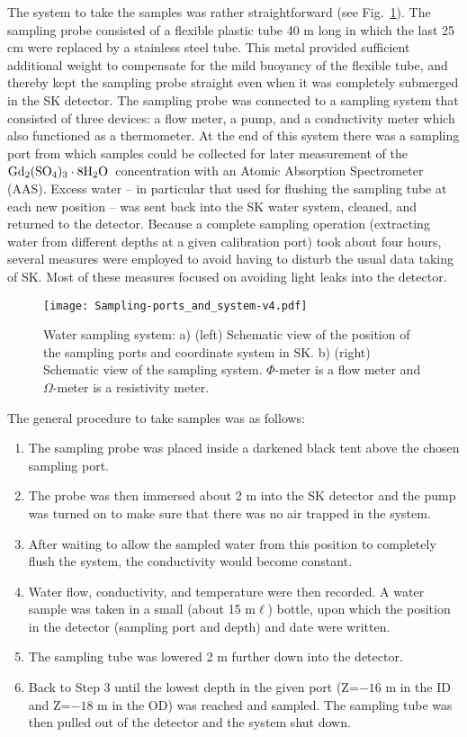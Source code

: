 \documentclass[preprint,12pt]{elsarticle}
\newcommand{\GdSOw}{$\rm Gd_2(\rm SO_4)_3\cdot \rm 8H_2O$\ }
\begin{document}
The system to take the samples was rather straightforward (see Fig.~\ref{fig:sampling_ports_and_system}). The sampling probe consisted of a flexible plastic tube 40 m long in which the last 25 cm were replaced by a stainless steel tube. This metal provided sufficient additional weight to compensate for the mild buoyancy of the flexible tube, and thereby kept the sampling probe straight even when it was completely submerged in the SK detector. %
The sampling probe was connected to a sampling system that consisted of three devices: a flow meter, a pump, and a conductivity meter which also functioned as a thermometer. At the end of this system there was a sampling port from which samples could be collected for later measurement of the \GdSOw concentration with an Atomic Absorption Spectrometer (AAS). Excess water -- in particular that used for flushing the sampling tube at each new position -- was sent back into the SK water system, cleaned, and returned to the detector. Because a complete sampling operation (extracting water from different depths at a given calibration port) took about four hours, several measures were employed to avoid having to disturb the usual data taking of SK. Most of these measures focused on avoiding light leaks into the detector.


\begin{figure}[htb]
\centering\texttt{[image: Sampling-ports\_and\_system-v4.pdf]}
\caption{Water sampling system: a) (left) Schematic view of the position of the sampling ports and coordinate system in SK. b) (right) Schematic view of the sampling system.
$\Phi$-meter is a flow meter and $\Omega$-meter is a resistivity meter.}
\label{fig:sampling_ports_and_system}
\end{figure}

The general procedure to take samples was as follows: 
\begin{enumerate}
\item The sampling probe was placed inside a darkened black tent above the chosen sampling port.
\item The probe was then immersed about 2 m into the SK detector and the pump was turned on to make sure that there was no air trapped in the system.
\item After waiting to allow the sampled water from this position to completely flush the system, the conductivity would become constant.
\item Water flow, conductivity, and temperature were then recorded. A water sample was taken in a small (about 15 m$\ell$) bottle, upon which the position in the detector (sampling port and depth) and date were written.
\item The sampling tube was lowered 2 m further down into the detector.
\item Back to Step 3 until the lowest depth in the given port (Z=$-16$ m in the ID and Z=$-18$ m in the OD) was reached and sampled. The sampling tube was then pulled out of the detector and the system shut down.
\end{enumerate}
\end{document}
